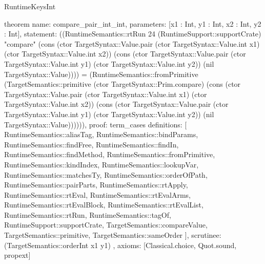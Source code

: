 \begin{lexlean}{RuntimeKeysInt}
\begin{semanticmodule}
theorem{
  name: compare_pair_int_int,
  parameters: [x1 : Int, y1 : Int, x2 : Int, y2 : Int],
  statement: ((RuntimeSemantics::rtRun 24 (RuntimeSupport::supportCrate) "compare" (cons (ctor TargetSyntax::Value.pair (ctor TargetSyntax::Value.int x1) (ctor TargetSyntax::Value.int x2)) (cons (ctor TargetSyntax::Value.pair (ctor TargetSyntax::Value.int y1) (ctor TargetSyntax::Value.int y2)) (nil TargetSyntax::Value)))) = (RuntimeSemantics::fromPrimitive (TargetSemantics::primitive (ctor TargetSyntax::Prim.compare) (cons (ctor TargetSyntax::Value.pair (ctor TargetSyntax::Value.int x1) (ctor TargetSyntax::Value.int x2)) (cons (ctor TargetSyntax::Value.pair (ctor TargetSyntax::Value.int y1) (ctor TargetSyntax::Value.int y2)) (nil TargetSyntax::Value)))))),
  proof: term_cases{
    definitions: [
      RuntimeSemantics::aliasTag,
      RuntimeSemantics::bindParams,
      RuntimeSemantics::findFree,
      RuntimeSemantics::findIn,
      RuntimeSemantics::findMethod,
      RuntimeSemantics::fromPrimitive,
      RuntimeSemantics::kindIndex,
      RuntimeSemantics::lookupVar,
      RuntimeSemantics::matchesTy,
      RuntimeSemantics::orderOfPath,
      RuntimeSemantics::pairParts,
      RuntimeSemantics::rtApply,
      RuntimeSemantics::rtEval,
      RuntimeSemantics::rtEvalArms,
      RuntimeSemantics::rtEvalBlock,
      RuntimeSemantics::rtEvalList,
      RuntimeSemantics::rtRun,
      RuntimeSemantics::tagOf,
      RuntimeSupport::supportCrate,
      TargetSemantics::compareValue,
      TargetSemantics::primitive,
      TargetSemantics::sameOrder
    ],
    scrutinee: (TargetSemantics::orderInt x1 y1)
  },
  axioms: [Classical.choice, Quot.sound, propext]
}


\end{semanticmodule}
\end{lexlean}
